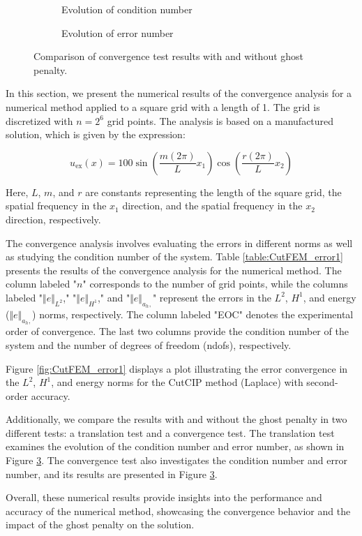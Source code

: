 \begin{figure}[h!]
    \centering
    \begin{subfigure}{0.49\textwidth}
        \centering
        
        \caption{Evolution of condition number}
        \label{subfig:cond}
    \end{subfigure}
    \hfill
    \begin{subfigure}{0.49\textwidth}
        \centering
        
        \caption{Evolution of error number}
        \label{subfig:error}
    \end{subfigure}
    \caption{Comparison of convergence test results with and without ghost penalty.}
    \label{fig:combined}
\end{figure}

In this section, we present the numerical results of the convergence analysis for a numerical method applied to a square grid with a length of 1. The grid is discretized with $n=2^6$ grid points. The analysis is based on a manufactured solution, which is given by the expression:

\[
u_{\text{ex}}(x) = 100 \sin\left(\frac{m(2\pi)}{L}x_1\right)\cos\left(\frac{r(2\pi)}{L}x_2\right)
\]

Here, $L$, $m$, and $r$ are constants representing the length of the square grid, the spatial frequency in the $x_1$ direction, and the spatial frequency in the $x_2$ direction, respectively.

The convergence analysis involves evaluating the errors in different norms as well as studying the condition number of the system. Table \ref{table:CutFEM_error1} presents the results of the convergence analysis for the numerical method. The column labeled "$n$" corresponds to the number of grid points, while the columns labeled "$\Vert e \Vert_{L^2}$," "$\Vert e \Vert_{H^1}$," and "$\Vert e \Vert_{a_h,}$" represent the errors in the $L^2$, $H^1$, and energy ($\Vert e \Vert_{a_h,}$) norms, respectively. The column labeled "EOC" denotes the experimental order of convergence. The last two columns provide the condition number of the system and the number of degrees of freedom (ndofs), respectively.

Figure \ref{fig:CutFEM_error1} displays a plot illustrating the error convergence in the $L^2$, $H^1$, and energy norms for the CutCIP method (Laplace) with second-order accuracy.

Additionally, we compare the results with and without the ghost penalty in two different tests: a translation test and a convergence test. The translation test examines the evolution of the condition number and error number, as shown in Figure \ref{fig:combined}. The convergence test also investigates the condition number and error number, and its results are presented in Figure \ref{fig:combined}.

Overall, these numerical results provide insights into the performance and accuracy of the numerical method, showcasing the convergence behavior and the impact of the ghost penalty on the solution.





